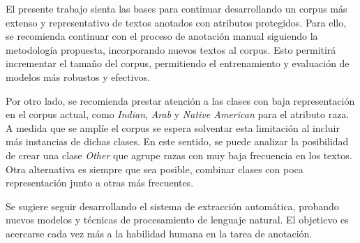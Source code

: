 \begin{recomendations}
    El presente trabajo sienta las bases para continuar desarrollando un corpus m\'as extenso y 
    representativo de textos anotados con atributos protegidos. Para ello, se recomienda 
    continuar con el proceso de anotaci\'on manual siguiendo la metodolog\'ia propuesta,
    incorporando nuevos textos al corpus. Esto permitir\'a incrementar el tama\~no del 
    corpus, permitiendo el entrenamiento y evaluaci\'on de modelos m\'as robustos y efectivos.
    
    Por otro lado, se recomienda prestar atenci\'on a las clases con baja representaci\'on en el 
    corpus actual, como \emph{Indian}, \emph{Arab} y \emph{Native American} para el atributo raza.
    A medida que se ampl\'ie el corpus se espera solventar esta limitaci\'on al incluir m\'as 
    instancias de dichas clases. En este sentido, se puede analizar la posibilidad de crear una 
    clase \emph{Other} que agrupe razas con muy baja frecuencia en los textos. Otra alternativa es 
    siempre que sea posible, combinar clases con poca representaci\'on junto a otras m\'as 
    frecuentes.

    Se sugiere seguir desarrollando el sistema de extracci\'on autom\'atica, probando nuevos modelos
    y t\'ecnicas de procesamiento de lenguaje natural. El objeticvo es acercarse cada vez m\'as a 
    la habilidad humana en la tarea de anotaci\'on.

\end{recomendations}

